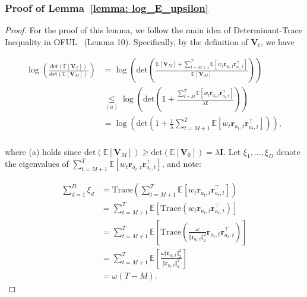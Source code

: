 \subsubsection{Proof of Lemma~\ref{lemma: log_E_upsilon}}
\label{sec: proof_lemma_log_E_upsilon}

\begin{proof}

For the proof of this lemma, we follow the main idea of Determinant-Trace Inequality in OFUL~\cite{abbasi2011improved} (Lemma 10).
Specifically, by the definition of $\boldsymbol{V}_{t}$, we have 

\begin{equation}
\begin{aligned}
\label{eq: log_E_upsilon1}
\log \left( \frac{ \text{det} \left(\mathbb{E}[\boldsymbol{V}_{T}] \right) }{ \text{det} \left(\mathbb{E}[\boldsymbol{V}_{M}] \right)} \right)
& =
\log \left( \text{det} \left( \frac{ \mathbb{E}[\boldsymbol{V}_{M}] + \sum_{t=M+1}^{T} \mathbb{E}[ w_t \boldsymbol{r}_{a_t,t} \boldsymbol{r}_{a_t,t}^{\top}] }{ \mathbb{E}[\boldsymbol{V}_{M}] } \right) \right) \\
& \underset{(a)}{\leq}
\log \left( \text{det} \left( 1 + \frac{ \sum_{t=M}^{T} \mathbb{E}[ w_t \boldsymbol{r}_{a_t,t} \boldsymbol{r}_{a_t,t}^{\top}] }{ \lambda \boldsymbol{I} } \right) \right) \\
& = 
\log \left( \text{det} \left( 1 +  \frac{1}{\lambda} \sum_{t=M+1}^{T} \mathbb{E}[ w_t \boldsymbol{r}_{a_t,t} \boldsymbol{r}_{a_t,t}^{\top}]  \right) \right), \\
\end{aligned}
\end{equation}


where (a) holds since $\text{det}(\mathbb{E}[\boldsymbol{V}_{M}]) \geq \text{det}(\mathbb{E}[\boldsymbol{V}_{0}]) = \lambda \boldsymbol{I}$. Let $\xi_1, ... , \xi_D$ denote the eigenvalues of $\sum_{t=M+1}^{T} \mathbb{E}[ w_t \boldsymbol{r}_{a_t,t} \boldsymbol{r}_{a_t,t}^{\top}]$, and note:

\begin{equation}
\begin{aligned}
\label{eq: log_E_upsilon2}
\sum_{d=1}^{D} \xi_d 
& =
\text{Trace} \left( \sum_{t=M+1}^{T} \mathbb{E}[ w_t \boldsymbol{r}_{a_t,t} \boldsymbol{r}_{a_t,t}^{\top}] \right) \\
& =
\sum_{t=M+1}^{T} \mathbb{E} \left[\text{Trace} \left( w_t \boldsymbol{r}_{a_t,t} \boldsymbol{r}_{a_t,t}^{\top} \right) \right] \\
& =
\sum_{t=M+1}^{T} \mathbb{E} \left[\text{Trace} \left( \frac{\omega}{\Vert \boldsymbol{r}_{a_t,t} \Vert_2^2} \boldsymbol{r}_{a_t,t} \boldsymbol{r}_{a_t,t}^{\top} \right) \right] \\
& =
\sum_{t=M+1}^{T} \mathbb{E} \left[ \frac{\omega \Vert \boldsymbol{r}_{a_t,t} \Vert_2^2}{\Vert \boldsymbol{r}_{a_t,t} \Vert_2^2} \right] \\
& = 
\omega (T-M).
\end{aligned}
\end{equation}


\end{proof}
